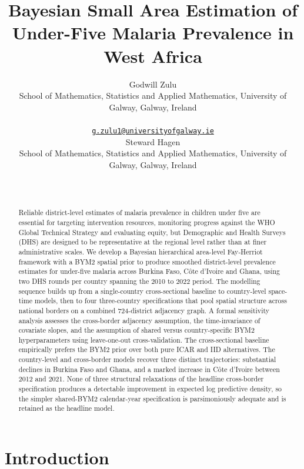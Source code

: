 \documentclass{article}
\title{Bayesian Small Area Estimation of Under-Five Malaria Prevalence
in West Africa}
\author{
    Godwill Zulu
   \\
    School of Mathematics, Statistics and Applied Mathematics,
University of Galway, Galway, Ireland \\
   \\
  \texttt{\href{mailto:g.zulu1@universityofgalway.ie}{\nolinkurl{g.zulu1@universityofgalway.ie}}} \\
   \And
    Steward Hagen
   \\
    School of Mathematics, Statistics and Applied Mathematics,
University of Galway, Galway, Ireland \\
   \\
  \texttt{} \\
  }
\begin{document}
\maketitle


\begin{abstract}
Reliable district-level estimates of malaria prevalence in children
under five are essential for targeting intervention resources,
monitoring progress against the WHO Global Technical Strategy and
evaluating equity, but Demographic and Health Surveys (DHS) are designed
to be representative at the regional level rather than at finer
administrative scales. We develop a Bayesian hierarchical area-level
Fay-Herriot framework with a BYM2 spatial prior to produce smoothed
district-level prevalence estimates for under-five malaria across
Burkina Faso, Côte d'Ivoire and Ghana, using two DHS rounds per country
spanning the 2010 to 2022 period. The modelling sequence builds up from
a single-country cross-sectional baseline to country-level space-time
models, then to four three-country specifications that pool spatial
structure across national borders on a combined 724-district adjacency
graph. A formal sensitivity analysis assesses the cross-border adjacency
assumption, the time-invariance of covariate slopes, and the assumption
of shared versus country-specific BYM2 hyperparameters using
leave-one-out cross-validation. The cross-sectional baseline empirically
prefers the BYM2 prior over both pure ICAR and IID alternatives. The
country-level and cross-border models recover three distinct
trajectories: substantial declines in Burkina Faso and Ghana, and a
marked increase in Côte d'Ivoire between 2012 and 2021. None of three
structural relaxations of the headline cross-border specification
produces a detectable improvement in expected log predictive density, so
the simpler shared-BYM2 calendar-year specification is parsimoniously
adequate and is retained as the headline model.
\end{abstract}


\section{Introduction}\label{introduction}

\label{sec:intro}
\end{document}

